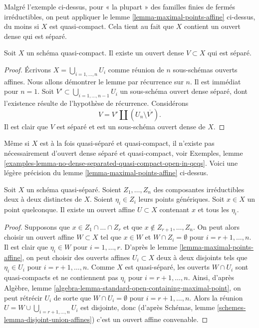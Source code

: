 \noindent
Malgré l'exemple ci-dessus, pour « la plupart » des familles finies de fermés
irréductibles, on peut appliquer le lemme \ref{lemma-maximal-points-affine} ci-dessus,
du moins si $X$ est quasi-compact. Cela tient au fait que $X$ contient un
ouvert dense qui est séparé.

\begin{lemma}
\label{lemma-quasi-compact-dense-open-separated}
Soit $X$ un schéma quasi-compact.
Il existe un ouvert dense $V \subset X$ qui est séparé.
\end{lemma}

\begin{proof}
Écrivons $X = \bigcup_{i = 1, \ldots, n} U_i$ comme réunion de $n$ sous-schémas
ouverts affines. Nous allons démontrer le lemme par récurrence sur $n$. Il est immédiat pour
$n = 1$. Soit $V' \subset \bigcup_{i = 1, \ldots, n - 1} U_i$ un sous-schéma
ouvert dense séparé, dont l'existence résulte de l'hypothèse de récurrence. Considérons
$$
V = V' \amalg (U_n \setminus \overline{V'}).
$$
Il est clair que $V$ est séparé et est un sous-schéma ouvert dense de $X$.
\end{proof}

\noindent
Même si $X$ est à la fois quasi-séparé et quasi-compact, il
n'existe pas nécessairement d'ouvert dense séparé et quasi-compact,
voir Exemples, lemme
\ref{examples-lemma-no-dense-separated-quasi-compact-open-in-qcqs}.
Voici une légère précision du lemme \ref{lemma-maximal-points-affine} ci-dessus.

\begin{lemma}
\label{lemma-point-and-maximal-points-affine}
Soit $X$ un schéma quasi-séparé. Soient $Z_1, \ldots, Z_n$ des
composantes irréductibles deux à deux distinctes de $X$. Soient $\eta_i \in Z_i$ leurs
points génériques. Soit $x \in X$ un point
quelconque. Il existe un ouvert affine $U \subset X$ contenant
$x$ et tous les $\eta_i$.
\end{lemma}

\begin{proof}
Supposons que $x \in Z_1 \cap \ldots \cap Z_r$ et que
$x \not \in Z_{r + 1}, \ldots, Z_n$. On peut alors choisir
un ouvert affine $W \subset X$ tel que
$x \in W$ et $W \cap Z_i = \emptyset$ pour
$i = r + 1, \ldots, n$. Il est clair que $\eta_i \in W$
pour $i = 1, \ldots, r$. D'après le lemme \ref{lemma-maximal-points-affine},
on peut choisir des ouverts affines $U_i \subset X$ deux à deux
disjoints tels que $\eta_i \in U_i$ pour $i = r + 1, \ldots, n$.
Comme $X$ est quasi-séparé, les ouverts $W \cap U_i$
sont quasi-compacts et ne contiennent pas $\eta_i$ pour
$i = r + 1, \ldots, n$. Ainsi,
d'après Algèbre, lemme \ref{algebra-lemma-standard-open-containing-maximal-point},
on peut rétrécir $U_i$ de sorte que $W \cap U_i = \emptyset$
pour $i = r + 1, \ldots, n$. Alors la réunion
$U = W \cup \bigcup_{i = r + 1, \ldots, n} U_i$ est disjointe, donc
(d'après Schémas, lemme \ref{schemes-lemma-disjoint-union-affines})
c'est un ouvert affine convenable.
\end{proof}


